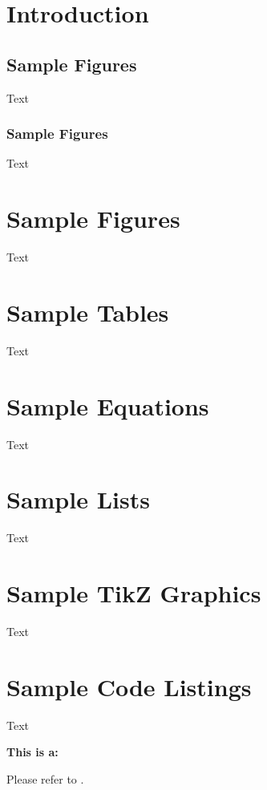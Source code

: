 \documentclass[]{nasa-latex-docs}
\begin{document}
\section{Introduction}

\lipsum[1-2]

\subsection{Sample Figures}

Text

\subsubsection{Sample Figures}

Text

\section{Sample Figures}

Text

\section{Sample Tables}

Text

\section{Sample Equations}

Text

\section{Sample Lists}

Text

\section{Sample TikZ Graphics}

Text

\section{Sample Code Listings}

Text

\textbf{This is a: \docTypeName}

Please refer to \cite{Template-Guide}.
\end{document}
